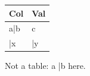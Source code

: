\documentclass[11pt,a4paper]{article}
\begin{document}
\begin{table}[h]
\begin{tabular}{|l|l|}
\hline
Col & Val \\ \hline
a|b & c \\ \hline
|x & |y \\ \hline
\end{tabular}
\end{table}

Not a table: a |b here.
\end{document}
